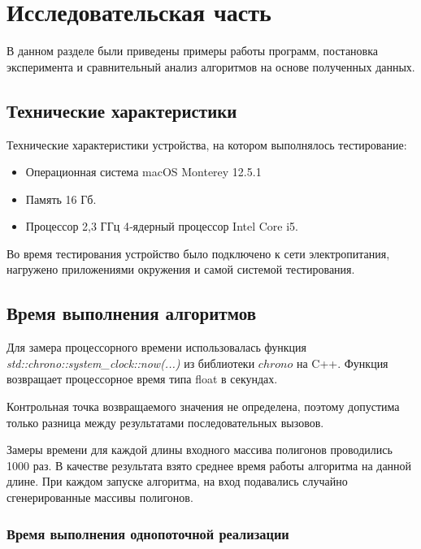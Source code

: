 \chapter{Исследовательская часть}

В данном разделе были приведены примеры работы программ, постановка эксперимента и сравнительный анализ алгоритмов на основе полученных данных.

\section{Технические характеристики}

Технические характеристики устройства, на котором выполнялось тестирование:

\begin{itemize}
	\item Операционная система macOS Monterey 12.5.1 
	\item Память 16 Гб.
	\item Процессор 2,3 ГГц 4‑ядерный процессор Intel Core i5.
\end{itemize}

Во время тестирования устройство было подключено к сети электропитания, нагружено приложениями окружения и самой  системой тестирования.

\section{Время выполнения алгоритмов}

Для замера процессорного времени использовалась функция 
\\ \textit{std::chrono::system\_clock::now(...)} из библиотеки $chrono$ \cite{cpp-lang-chrono} на C++. Функция возвращает процессорное время типа float в секундах.

Контрольная точка возвращаемого значения не определена, поэтому допустима только разница между результатами последовательных вызовов.

Замеры времени для каждой длины входного массива полигонов проводились 1000 раз. В качестве результата взято среднее время работы алгоритма на данной длине. При каждом запуске алгоритма, на вход подавались случайно сгенерированные массивы полигонов. 

\subsection{Время выполнения однопоточной реализации}

